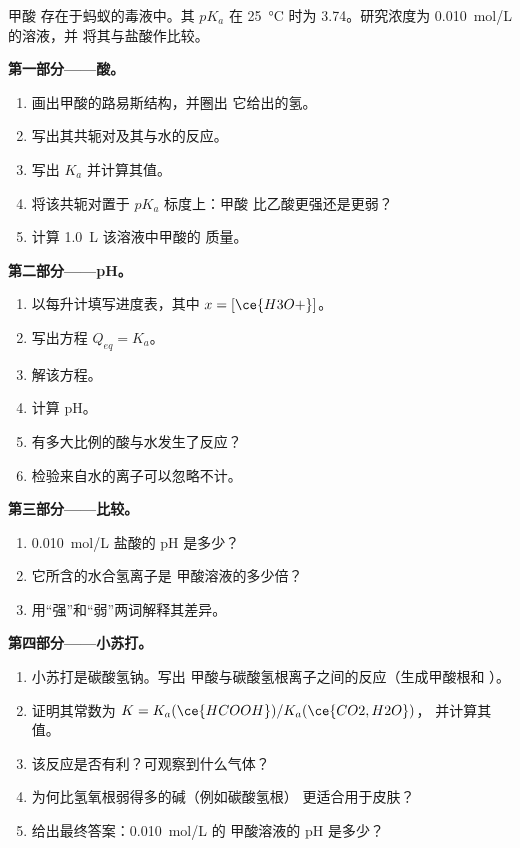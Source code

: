 \begin{problem}
\label{pb:g12:ka-and-pka:1}
甲酸  存在于蚂蚁的毒液中。其 $pK_a$ 在
\qty{25}{\celsius} 时为 3.74。研究浓度为 \qty{0.010}{mol/L} 的溶液，并
将其与盐酸作比较。

\medskip
\noindent\textbf{第一部分——酸。}
\begin{enumerate}
  \item 画出甲酸的路易斯结构，并圈出
        它给出的氢。
  \item 写出其共轭对及其与水的反应。
  \item 写出 $K_a$ 并计算其值。
  \item 将该共轭对置于 $pK_a$ 标度上：甲酸
        比乙酸更强还是更弱？
  \item 计算 \qty{1.0}{L} 该溶液中甲酸的
        质量。
\end{enumerate}

\medskip
\noindent\textbf{第二部分——pH。}
\begin{enumerate}[resume]
  \item 以每升计填写进度表，其中 $x = [\ce{H3O+}]$。
  \item 写出方程 $Q_{eq} = K_a$。
  \item 解该方程。
  \item 计算 pH。
  \item 有多大比例的酸与水发生了反应？
  \item 检验来自水的离子可以忽略不计。
\end{enumerate}

\medskip
\noindent\textbf{第三部分——比较。}
\begin{enumerate}[resume]
  \item \qty{0.010}{mol/L} 盐酸的 pH 是多少？
  \item 它所含的水合氢离子是
        甲酸溶液的多少倍？
  \item 用“强”和“弱”两词解释其差异。
\end{enumerate}

\medskip
\noindent\textbf{第四部分——小苏打。}
\begin{enumerate}[resume]
  \item 小苏打是碳酸氢钠。写出
        甲酸与碳酸氢根离子之间的反应（生成甲酸根和
        ）。
  \item 证明其常数为 $K = K_a(\ce{HCOOH}) / K_a(\ce{CO2,H2O})$，
        并计算其值。
  \item 该反应是否有利？可观察到什么气体？
  \item 为何比氢氧根弱得多的碱（例如碳酸氢根）
        更适合用于皮肤？
  \item 给出最终答案：\qty{0.010}{mol/L} 的
        甲酸溶液的 pH 是多少？
\end{enumerate}
\end{problem}
